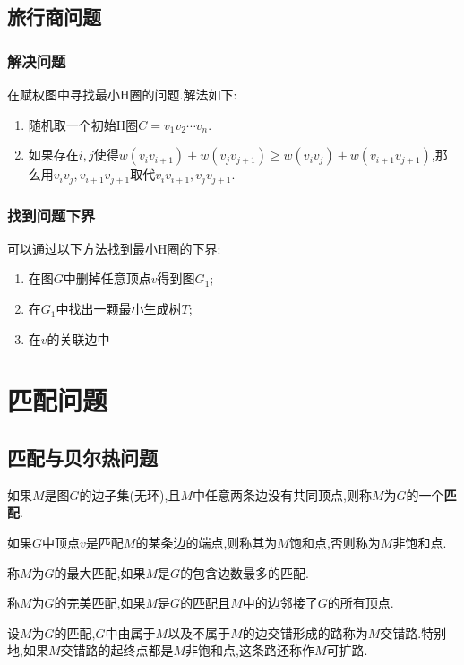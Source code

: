 \subsection{旅行商问题}
\subsubsection{解决问题}
在赋权图中寻找最小H圈的问题.解法如下:
\begin{enumerate}[1)]
    \item 随机取一个初始H圈$C = v_1 v_2 \cdots v_n$.
    \item 如果存在$i,j$使得$w(v_i v_{i+1}) + w(v_j v_{j+1}) \ge w(v_i v_j) + w(v_{i+1} v_{j+1})$,那么用$v_i v_j,v_{i+1} v_{j+1}$取代$v_i v_{i+1},v_j v_{j+1}$.
\end{enumerate}
\subsubsection{找到问题下界}
可以通过以下方法找到最小H圈的下界:
\begin{enumerate}[1)]
    \item 在图$G$中删掉任意顶点$v$得到图$G_1$;
    \item 在$G_1$中找出一颗最小生成树$T$;
    \item 在$v$的关联边中
\end{enumerate}

\section{匹配问题}
\subsection{匹配与贝尔热问题}
\begin{definition}[匹配]
如果$M$是图$G$的边子集(无环),且$M$中任意两条边没有共同顶点,则称$M$为$G$的一个\textbf{匹配}.
\end{definition}
如果$G$中顶点$v$是匹配$M$的某条边的端点,则称其为$M$饱和点,否则称为$M$非饱和点.
\begin{definition}[最大匹配]
称$M$为$G$的最大匹配,如果$M$是$G$的包含边数最多的匹配.
\end{definition}

\begin{definition}[完美匹配]
称$M$为$G$的完美匹配,如果$M$是$G$的匹配且$M$中的边邻接了$G$的所有顶点.
\end{definition}

\begin{definition}[交错路]
设$M$为$G$的匹配,$G$中由属于$M$以及不属于$M$的边交错形成的路称为$M$交错路.特别地,如果$M$交错路的起终点都是$M$非饱和点,这条路还称作$M$可扩路.
\end{definition}

